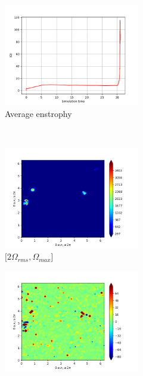 \begin{figure}[H]
    \begin{subfigure}[H]{0.45\textwidth}
        \includegraphics[height=1.75in]{media/run-cds-65/enst-average1460.png}
        \caption{Average enstrophy}
    \end{subfigure}
    ~
    \begin{subfigure}[H]{0.45\textwidth}
        \includegraphics[height=1.75in]{media/run-cds-65/enst-2-1460.png}
        \caption{$[2\Omega_{rms}, \Omega_{max} $] }
    \end{subfigure}
    \newline
    \begin{subfigure}[H]{0.45\textwidth}
        \includegraphics[height=1.75in]{media/run-cds-65/enst-1460.png}

\end{subfigure}
\end{figure}
